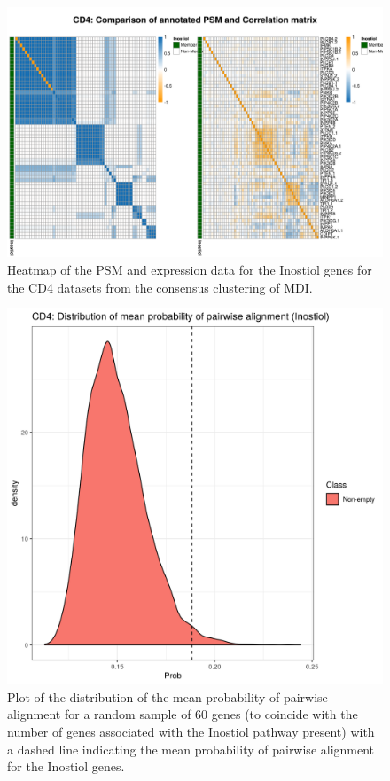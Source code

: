\documentclass[12pt]{article} %
\begin{document}
	\begin{figure}
		\centering
		\includegraphics[scale=0.75]{Images/Biology_data/Set_250/All_datasets/Heatmaps/KEGG_INOSITOL_PHOSPHATE_METABOLISM/CD4_comp_psm_corr.png}
		\caption{Heatmap of the PSM and expression data for the Inostiol genes for the CD4 datasets from the consensus clustering of MDI.}
		\label{fig:results:cedar_1:mdi_cd4_inostiol_psm_cor}
	\end{figure}


\begin{figure}[h]
	\centering
	\includegraphics[scale=0.75]{Images/Biology_data/Set_250/All_datasets/Mean_alignment_probability/CD4_KEGG_INOSITOL_PHOSPHATE_METABOLISM.png}
	\caption{Plot of the distribution of the mean probability of pairwise alignment for a random sample of 60 genes (to coincide with the number of genes associated with the Inostiol pathway present) with a dashed line indicating the mean probability of pairwise alignment for the Inostiol genes.}
	\label{fig:results:cedar_1:mdi_cd4_inostiol_alignemnt_prob_distn}
\end{figure}
\end{document}

